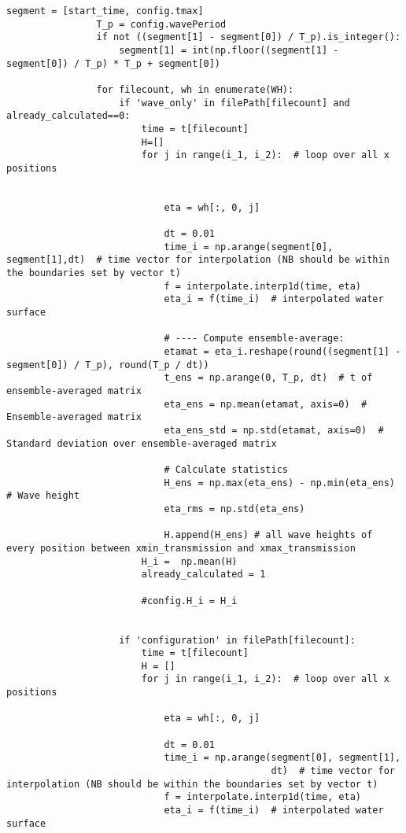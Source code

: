 \begin{mdframed}[backgroundcolor=light-gray, roundcorner=10pt,leftmargin=1, rightmargin=1, innerleftmargin=0, innertopmargin=7,innerbottommargin=0, outerlinewidth=1, linecolor=light-gray]
\begin{lstlisting}[linewidth=\columnwidth,caption=Functions used in post-processing ., label=script: post processing functions]
                segment = [start_time, config.tmax]
                T_p = config.wavePeriod
                if not ((segment[1] - segment[0]) / T_p).is_integer():
                    segment[1] = int(np.floor((segment[1] - segment[0]) / T_p) * T_p + segment[0])

                for filecount, wh in enumerate(WH):
                    if 'wave_only' in filePath[filecount] and already_calculated==0:
                        time = t[filecount]
                        H=[]
                        for j in range(i_1, i_2):  # loop over all x positions


                            eta = wh[:, 0, j]

                            dt = 0.01
                            time_i = np.arange(segment[0], segment[1],dt)  # time vector for interpolation (NB should be within the boundaries set by vector t)
                            f = interpolate.interp1d(time, eta)
                            eta_i = f(time_i)  # interpolated water surface

                            # ---- Compute ensemble-average:
                            etamat = eta_i.reshape(round((segment[1] - segment[0]) / T_p), round(T_p / dt))
                            t_ens = np.arange(0, T_p, dt)  # t of ensemble-averaged matrix
                            eta_ens = np.mean(etamat, axis=0)  # Ensemble-averaged matrix
                            eta_ens_std = np.std(etamat, axis=0)  # Standard deviation over ensemble-averaged matrix

                            # Calculate statistics
                            H_ens = np.max(eta_ens) - np.min(eta_ens)  # Wave height
                            eta_rms = np.std(eta_ens)

                            H.append(H_ens) # all wave heights of every position between xmin_transmission and xmax_transmission
                        H_i =  np.mean(H)
                        already_calculated = 1

                        #config.H_i = H_i


                    if 'configuration' in filePath[filecount]:
                        time = t[filecount]
                        H = []
                        for j in range(i_1, i_2):  # loop over all x positions

                            eta = wh[:, 0, j]

                            dt = 0.01
                            time_i = np.arange(segment[0], segment[1],
                                               dt)  # time vector for interpolation (NB should be within the boundaries set by vector t)
                            f = interpolate.interp1d(time, eta)
                            eta_i = f(time_i)  # interpolated water surface


\end{lstlisting}
\end{mdframed}

